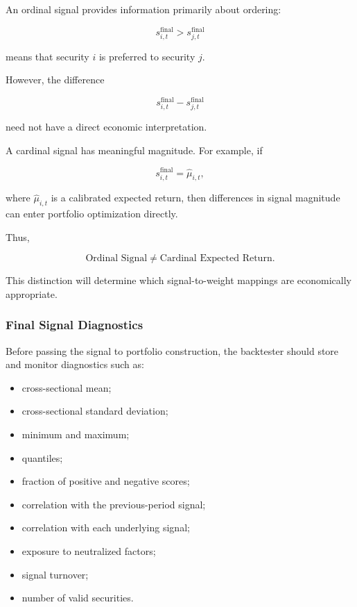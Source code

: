 \documentclass[11pt,a4paper]{article}
\begin{document}
An ordinal signal provides information primarily about ordering:

\begin{equation}
s_{i,t}^{\mathrm{final}}
>
s_{j,t}^{\mathrm{final}}
\end{equation}

means that security $i$ is preferred to security $j$.

However, the difference

\begin{equation}
s_{i,t}^{\mathrm{final}}
-
s_{j,t}^{\mathrm{final}}
\end{equation}

need not have a direct economic interpretation.

A cardinal signal has meaningful magnitude. For example, if

\begin{equation}
s_{i,t}^{\mathrm{final}}
=
\widehat{\mu}_{i,t},
\end{equation}

where $\widehat{\mu}_{i,t}$ is a calibrated expected return, then differences in
signal magnitude can enter portfolio optimization directly.

Thus,

\begin{equation}
\boxed{
\text{Ordinal Signal}
\neq
\text{Cardinal Expected Return}.
}
\end{equation}

This distinction will determine which signal-to-weight mappings are
economically appropriate.


\subsubsection{Final Signal Diagnostics}

Before passing the signal to portfolio construction, the backtester should
store and monitor diagnostics such as:

\begin{itemize}
    \item cross-sectional mean;
    \item cross-sectional standard deviation;
    \item minimum and maximum;
    \item quantiles;
    \item fraction of positive and negative scores;
    \item correlation with the previous-period signal;
    \item correlation with each underlying signal;
    \item exposure to neutralized factors;
    \item signal turnover;
    \item number of valid securities.
\end{itemize}
\end{document}

